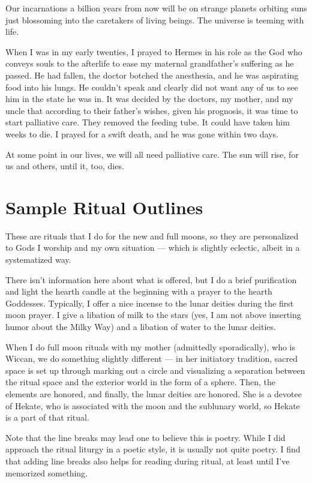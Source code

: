 \documentclass[
]{book}
\begin{document}
Our incarnations a billion years from now will be on strange planets orbiting suns just blossoming into the caretakers of living beings. The universe is teeming with life.

When I was in my early twenties, I prayed to Hermes in his role as the God who conveys souls to the afterlife to ease my maternal grandfather's suffering as he passed. He had fallen, the doctor botched the anesthesia, and he was aspirating food into his lungs. He couldn't speak and clearly did not want any of us to see him in the state he was in. It was decided by the doctors, my mother, and my uncle that according to their father's wishes, given his prognosis, it was time to start palliative care. They removed the feeding tube. It could have taken him weeks to die. I prayed for a swift death, and he was gone within two days.

At some point in our lives, we will all need palliative care. The sun will rise, for us and others, until it, too, dies.

\hypertarget{sample-ritual-outlines}{%
\section{Sample Ritual Outlines}\label{sample-ritual-outlines}}

These are rituals that I do for the new and full moons, so they are personalized to Gods I worship and my own situation --- which is slightly eclectic, albeit in a systematized way.

There isn't information here about what is offered, but I do a brief purification and light the hearth candle at the beginning with a prayer to the hearth Goddesses. Typically, I offer a nice incense to the lunar deities during the first moon prayer. I give a libation of milk to the stars (yes, I am not above inserting humor about the Milky Way) and a libation of water to the lunar deities.

When I do full moon rituals with my mother (admittedly sporadically), who is Wiccan, we do something slightly different --- in her initiatory tradition, sacred space is set up through marking out a circle and visualizing a separation between the ritual space and the exterior world in the form of a sphere. Then, the elements are honored, and finally, the lunar deities are honored. She is a devotee of Hekate, who is associated with the moon and the sublunary world, so Hekate is a part of that ritual.

Note that the line breaks may lead one to believe this is poetry. While I did approach the ritual liturgy in a poetic style, it is usually not quite poetry. I find that adding line breaks also helps for reading during ritual, at least until I've memorized something.
\end{document}
